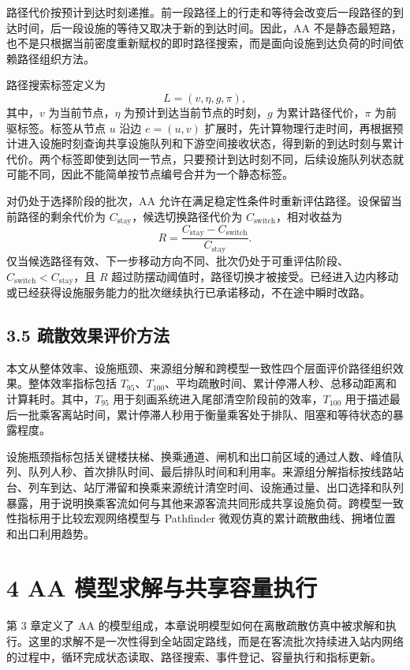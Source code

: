 \documentclass[UTF8,a4paper,12pt]{ctexart}
\begin{document}
路径代价按预计到达时刻递推。前一段路径上的行走和等待会改变后一段路径的到达时间，后一段设施的等待又取决于新的到达时间。因此，AA 不是静态最短路，也不是只根据当前密度重新赋权的即时路径搜索，而是面向设施到达负荷的时间依赖路径组织方法。

路径搜索标签定义为
\[
L=(v,\eta,g,\pi),
\]
其中，\(v\) 为当前节点，\(\eta\) 为预计到达当前节点的时刻，\(g\) 为累计路径代价，\(\pi\) 为前驱标签。标签从节点 \(u\) 沿边 \(e=(u,v)\) 扩展时，先计算物理行走时间，再根据预计进入设施时刻查询共享设施队列和下游空间接收状态，得到新的到达时刻与累计代价。两个标签即使到达同一节点，只要预计到达时刻不同，后续设施队列状态就可能不同，因此不能简单按节点编号合并为一个静态标签。

对仍处于选择阶段的批次，AA 允许在满足稳定性条件时重新评估路径。设保留当前路径的剩余代价为 \(C_{\mathrm{stay}}\)，候选切换路径代价为 \(C_{\mathrm{switch}}\)，相对收益为
\[
R=\frac{C_{\mathrm{stay}}-C_{\mathrm{switch}}}{C_{\mathrm{stay}}}.
\]
仅当候选路径有效、下一步移动方向不同、批次仍处于可重评估阶段、\(C_{\mathrm{switch}}<C_{\mathrm{stay}}\)，且 \(R\) 超过防摆动阈值时，路径切换才被接受。已经进入边内移动或已经获得设施服务能力的批次继续执行已承诺移动，不在途中瞬时改路。

\subsection{3.5 疏散效果评价方法}

本文从整体效率、设施瓶颈、来源组分解和跨模型一致性四个层面评价路径组织效果。整体效率指标包括 \(T_{95}\)、\(T_{100}\)、平均疏散时间、累计停滞人秒、总移动距离和计算耗时。其中，\(T_{95}\) 用于刻画系统进入尾部清空阶段前的效率，\(T_{100}\) 用于描述最后一批乘客离站时间，累计停滞人秒用于衡量乘客处于排队、阻塞和等待状态的暴露程度。

设施瓶颈指标包括关键楼扶梯、换乘通道、闸机和出口前区域的通过人数、峰值队列、队列人秒、首次排队时间、最后排队时间和利用率。来源组分解指标按线路站台、列车到达、站厅滞留和换乘来源统计清空时间、设施通过量、出口选择和队列暴露，用于说明换乘客流如何与其他来源客流共同形成共享设施负荷。跨模型一致性指标用于比较宏观网络模型与 Pathfinder 微观仿真的累计疏散曲线、拥堵位置和出口利用趋势。

\section{4 AA 模型求解与共享容量执行}

第 3 章定义了 AA 的模型组成，本章说明模型如何在离散疏散仿真中被求解和执行。这里的求解不是一次性得到全站固定路线，而是在客流批次持续进入站内网络的过程中，循环完成状态读取、路径搜索、事件登记、容量执行和指标更新。
\end{document}
